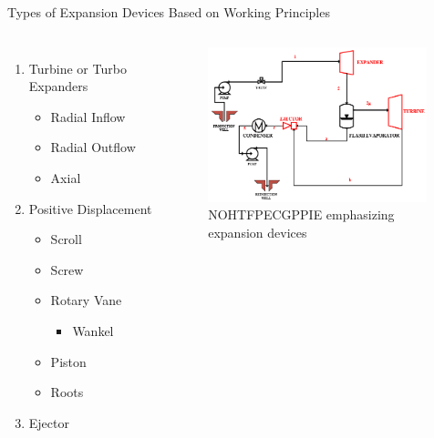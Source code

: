 \begin{frame}{Types of Expansion Devices Based on Working Principles\cite{smith2014power}}
   \begin{columns}
   \begin{enumerate}
        \item Turbine or Turbo Expanders
            \begin{itemize}
                \item Radial Inflow
                \item Radial Outflow
                \item Axial
            \end{itemize}
        \item Positive Displacement
            \begin{itemize}
                \item Scroll
                \item Screw
                \item Rotary Vane
                  \begin{itemize}
                    \item Wankel
                  \end{itemize}
                \item Piston
                \item Roots
            \end{itemize}
        \item Ejector
    \end{enumerate}
    \begin{figure}
        \centering
        \includegraphics[height=4.5cm]{images/nohtfpecgppiexd.png}
        \caption{\centering \scriptsize NOHTFPECGPPIE emphasizing expansion devices}
    \end{figure}
   \end{columns}
\end{frame}

